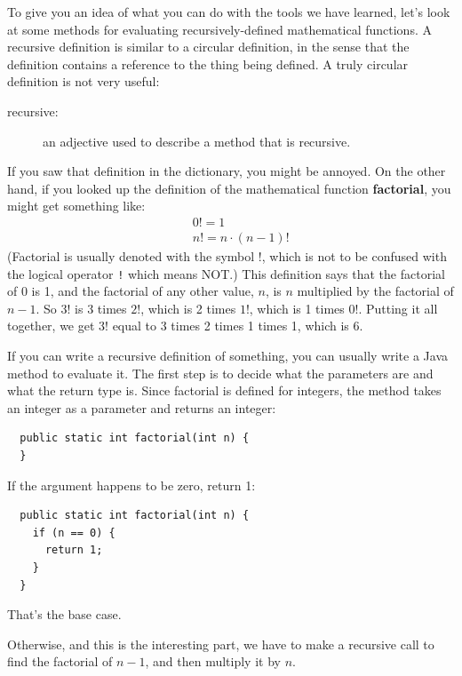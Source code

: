 To give you an idea of what you can do with the tools we have learned,
let's look at some methods for evaluating recursively-defined
mathematical functions.  A recursive definition is similar to a
circular definition, in the sense that the definition contains a
reference to the thing being defined.  A truly circular definition is
not very useful:

\begin{description}

\item[recursive:] an adjective used to describe a method that is recursive.

\end{description}

If you saw that definition in the dictionary, you might be
annoyed.  On the other hand, if you looked up the definition
of the mathematical function {\bf factorial}, you might
get something like:
%
\begin{eqnarray*}
&&  0! = 1 \\
&&  n! = n \cdot(n-1)!
\end{eqnarray*}
%
(Factorial is usually denoted with the symbol $!$, which is
not to be confused with the logical operator {\tt !} which
means NOT.)  This definition says that the factorial of 0 is 1,
and the factorial of any other value, $n$, is $n$ multiplied
by the factorial of $n-1$.  So $3!$ is 3 times $2!$, which is 2 times
$1!$, which is 1 times $0!$.  Putting it all together, we get
$3!$ equal to 3 times 2 times 1 times 1, which is 6.

If you can write a recursive definition of something, you can usually
write a Java method to evaluate it.  The first step is to decide what
the parameters are and what the return type is.  Since factorial is
defined for integers, the method takes an
integer as a parameter and returns an integer:

\begin{lstlisting}
  public static int factorial(int n) {
  }
\end{lstlisting}

\noindent If the argument happens to be zero, return 1:

\begin{lstlisting}
  public static int factorial(int n) {
    if (n == 0) {
      return 1;
    }
  }
\end{lstlisting}
%
That's the base case.

Otherwise, and this is the interesting part, we have to make
a recursive call to find the factorial of $n-1$, and then
multiply it by $n$.


